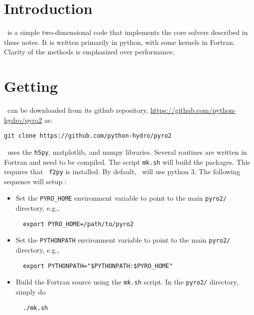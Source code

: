 \label{app:pyro}



\section{Introduction}

\pyro\ is a simple two-dimensional code that implements the core
solvers described in these notes.  It is written primarily in python,
with some kernels in Fortran.  Clarity of the methods is emphasized
over performance.


\section{Getting \pyro}

\pyro\ can be downloaded from its github repository, \url{https://github.com/python-hydro/pyro2} as:
\begin{verbatim}
git clone https://github.com/python-hydro/pyro2
\end{verbatim}

\pyro\ uses the {\tt h5py}, {\sf matplotlib}, and {\sf numpy} libraries.
Several routines are written in Fortran and need to be compiled.  The
script {\tt mk.sh} will build the packages.  This requires that {\tt
f2py} is installed.  By default, \pyro\ will use python 3.  
The following sequence will setup \pyro:
\begin{itemize}
\item Set the {\tt PYRO\_HOME} environment variable to point to the
  main {\tt pyro2/} directory, e.g.,
  \begin{verbatim}
  export PYRO_HOME=/path/to/pyro2
  \end{verbatim}

\item Set the {\tt PYTHONPATH} environment variable to point to the
  main {\tt pyro2/} directory, e.g.,
  \begin{verbatim}
  export PYTHONPATH="$PYTHONPATH:$PYRO_HOME"
  \end{verbatim}

\item Build the Fortran source using the {\tt mk.sh} script.  In the
  {\tt pyro2/} directory, simply do
  \begin{verbatim}
  ./mk.sh
  \end{verbatim}
\end{itemize}



